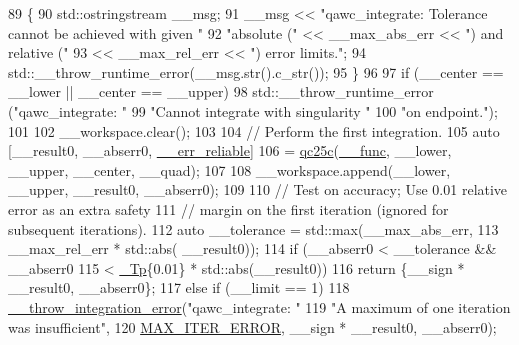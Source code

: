 \begin{DoxyCode}
89         \{
90           std::ostringstream \_\_msg;
91           \_\_msg << \textcolor{stringliteral}{"qawc\_integrate: Tolerance cannot be achieved with given "}
92                    \textcolor{stringliteral}{"absolute ("} << \_\_max\_abs\_err << \textcolor{stringliteral}{") and relative ("}
93                 << \_\_max\_rel\_err << \textcolor{stringliteral}{") error limits."};
94           std::\_\_throw\_runtime\_error(\_\_msg.str().c\_str());
95         \}
96 
97       \textcolor{keywordflow}{if} (\_\_center == \_\_lower || \_\_center == \_\_upper)
98         std::\_\_throw\_runtime\_error (\textcolor{stringliteral}{"qawc\_integrate: "}
99                                     \textcolor{stringliteral}{"Cannot integrate with singularity "}
100                                     \textcolor{stringliteral}{"on endpoint."});
101 
102       \_\_workspace.clear();
103 
104       \textcolor{comment}{// Perform the first integration.}
105       \textcolor{keyword}{auto} [\_\_result0, \_\_abserr0, \hyperlink{namespace____gnu__cxx_a989f5db5dc6da4eeca54cd1f93ec82ee}{\_\_err\_reliable}]
106         = \hyperlink{namespace____gnu__cxx_a0eeb3014f3114b5d73059433b58fba86}{qc25c}(\hyperlink{namespace____gnu__cxx_af2b2f0c7a2ae72b922b1afefae5a65b2}{\_\_func}, \_\_lower, \_\_upper, \_\_center, \_\_quad);
107 
108       \_\_workspace.append(\_\_lower, \_\_upper, \_\_result0, \_\_abserr0);
109 
110       \textcolor{comment}{// Test on accuracy; Use 0.01 relative error as an extra safety}
111       \textcolor{comment}{// margin on the first iteration (ignored for subsequent iterations).}
112       \textcolor{keyword}{auto} \_\_tolerance = std::max(\_\_max\_abs\_err,
113                                   \_\_max\_rel\_err * std::abs( \_\_result0));
114       \textcolor{keywordflow}{if} (\_\_abserr0 < \_\_tolerance && \_\_abserr0
115           < \hyperlink{namespace____gnu__cxx_a3b19a9c800ca194374ef9172290f7d79}{\_Tp}\{0.01\} * std::abs(\_\_result0))
116         \textcolor{keywordflow}{return} \{\_\_sign * \_\_result0, \_\_abserr0\};
117       \textcolor{keywordflow}{else} \textcolor{keywordflow}{if} (\_\_limit == 1)
118         \hyperlink{namespace____gnu__cxx_a2ae22137ca092b8ae10f4d42b4e32cfb}{\_\_throw\_integration\_error}(\textcolor{stringliteral}{"qawc\_integrate: "}
119                                   \textcolor{stringliteral}{"A maximum of one iteration was insufficient"},
120                                  \hyperlink{namespace____gnu__cxx_ad6c62dd86a596716cece6ac2d4cfd4b3a420d46d10205dd953d0ccce5323afc4c}{MAX\_ITER\_ERROR}, \_\_sign * \_\_result0, \_\_abserr0);

\end{DoxyCode}
